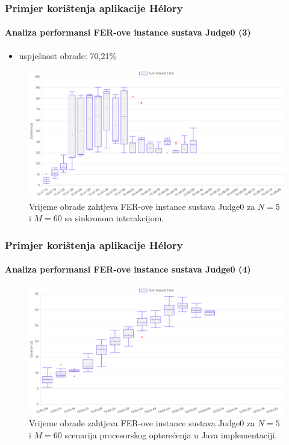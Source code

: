 \documentclass{beamer}
\newif\ifplacelogo
\begin{document}
\placelogofalse
\begin{frame}
\frametitle{Primjer korištenja aplikacije Hélory}
\framesubtitle{Analiza performansi FER-ove instance sustava Judge0 (3)}
\begin{itemize}
	\item uspješnost obrade: 70,21\%
\end{itemize}
\begin{figure}[htb]
	\centering
	\includegraphics[width=\textwidth]{images/Judge0 FER TAT for sync 5 5s.png}
	\caption{
		Vrijeme obrade zahtjeva FER-ove instance sustava Judge0 za $N=5$ i $M=60$ sa sinkronom interakcijom.
	}
\end{figure}
\end{frame}
\placelogotrue

\placelogofalse
\begin{frame}
\frametitle{Primjer korištenja aplikacije Hélory}
\framesubtitle{Analiza performansi FER-ove instance sustava Judge0 (4)}
\begin{figure}[htb]
	\centering
	\includegraphics[width=\textwidth]{images/Judge0 FER TAT for CPU Intensive Java 5x60 5s.png}
	\caption{
		Vrijeme obrade zahtjeva FER-ove instance sustava Judge0 za $N=5$ i $M=60$ scenarija procesorskog opterećenja u Java implementaciji.
	}
\end{figure}
\end{frame}
\placelogotrue
\end{document}
